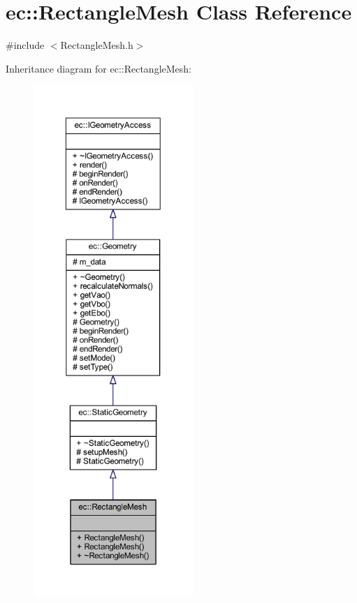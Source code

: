 \hypertarget{classec_1_1_rectangle_mesh}{}\section{ec\+:\+:Rectangle\+Mesh Class Reference}
\label{classec_1_1_rectangle_mesh}


{\ttfamily \#include $<$Rectangle\+Mesh.\+h$>$}



Inheritance diagram for ec\+:\+:Rectangle\+Mesh\+:\nopagebreak
\begin{figure}[H]
\begin{center}
\leavevmode
\includegraphics[height=550pt]{classec_1_1_rectangle_mesh__inherit__graph}
\end{center}
\end{figure}



